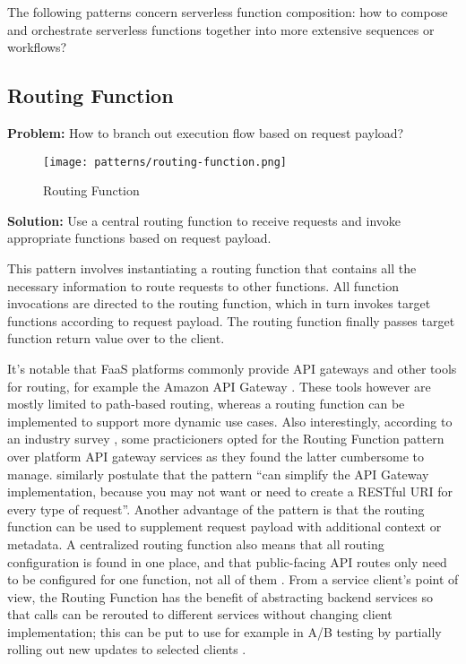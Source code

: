 The following patterns concern serverless function composition: how to compose and orchestrate serverless functions together into more extensive sequences or workflows?

\subsection{Routing Function} \label{subsec:routingFunction}

\textbf{Problem:} How to branch out execution flow based on request payload?

\begin{figure}[h]
  \centering
  \texttt{[image: patterns/routing-function.png]}
  \caption{Routing Function}
  \label{fig:patternRoutingFunction}
\end{figure}

\textbf{Solution:} Use a central routing function to receive requests and invoke appropriate functions based on request payload.

This pattern involves instantiating a routing function that contains all the necessary information to route requests to other functions. All function invocations are directed to the routing function, which in turn invokes target functions according to request payload. The routing function finally passes target function return value over to the client.

It's notable that FaaS platforms commonly provide API gateways and other tools for routing, for example the Amazon API Gateway \parencite{awslambda0218}. These tools however are mostly limited to path-based routing, whereas a routing function can be implemented to support more dynamic use cases. Also interestingly, according to an industry survey \parencite{leitner18industrialpractice}, some practicioners opted for the Routing Function pattern over platform API gateway services as they found the latter cumbersome to manage. \textcite{sbarski2017serverless} similarly postulate that the pattern ``can simplify the API Gateway implementation, because you may not want or need to create a RESTful URI for every type of request''. Another advantage of the pattern is that the routing function can be used to supplement request payload with additional context or metadata. A centralized routing function also means that all routing configuration is found in one place, and that public-facing API routes only need to be configured for one function, not all of them \parencite{leitner18industrialpractice}. From a service client's point of view, the Routing Function has the benefit of abstracting backend services so that calls can be rerouted to different services without changing client implementation; this can be put to use for example in A/B testing by partially rolling out new updates to selected clients \parencite{microsoft18cloudPatterns}.

